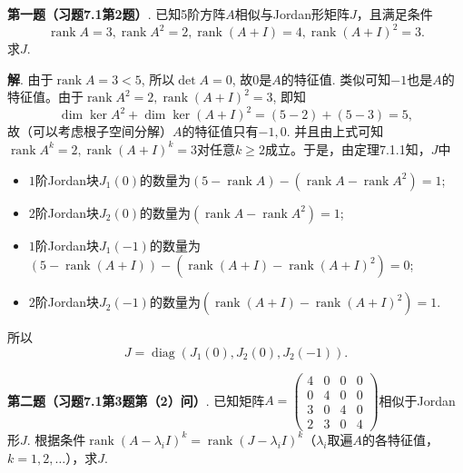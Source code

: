 \vspace{2em}

{\bf 第一题（习题7.1第2题）}. 已知5阶方阵$A$相似与Jordan形矩阵$J$，且满足条件
$$\operatorname{rank}A = 3, \operatorname{rank}A^2 = 2, \operatorname{rank}(A+I) = 4, \operatorname{rank}(A+I)^2 = 3.$$
求$J$.

{\bf 解}. 由于$\operatorname{rank}A = 3 < 5$, 所以$\det A = 0$, 故$0$是$A$的特征值. 类似可知$-1$也是$A$的特征值。由于$\operatorname{rank}A^2 = 2, \operatorname{rank}(A+I)^2 = 3$, 即知
$$\dim \ker A^2 + \dim \ker (A+I)^2 = (5-2) + (5-3) = 5,$$
故（可以考虑根子空间分解）$A$的特征值只有$-1, 0$. 并且由上式可知$\operatorname{rank}A^k = 2, \operatorname{rank}(A+I)^k = 3$对任意$k\geqslant 2$成立。于是，由定理7.1.1知，$J$中
\begin{itemize}
\item $1$阶Jordan块$J_1(0)$的数量为$(5 - \operatorname{rank}A) - (\operatorname{rank}A - \operatorname{rank}A^2) = 1$;
\item $2$阶Jordan块$J_2(0)$的数量为$(\operatorname{rank}A - \operatorname{rank}A^2) = 1$;
\item $1$阶Jordan块$J_1(-1)$的数量为$(5 - \operatorname{rank}(A+I)) - (\operatorname{rank}(A+I) - \operatorname{rank}(A+I)^2) = 0$;
\item $2$阶Jordan块$J_2(-1)$的数量为$(\operatorname{rank}(A+I) - \operatorname{rank}(A+I)^2) = 1$.
\end{itemize}
所以
$$J = \operatorname{diag} (J_1(0), J_2(0), J_2(-1)).$$


\newpageorvspace


{\bf 第二题（习题7.1第3题第（2）问）}. 已知矩阵$A = \begin{pmatrix} 4 & 0 & 0 & 0 \\ 0 & 4 & 0 & 0 \\ 3 & 0 & 4 & 0 \\ 2 & 3 & 0 & 4 \end{pmatrix}$相似于Jordan形$J$. 根据条件$\operatorname{rank}(A - \lambda_i I)^k = \operatorname{rank}(J - \lambda_i I)^k$（$\lambda_i$取遍$A$的各特征值，$k=1,2,\ldots$），求$J$.

